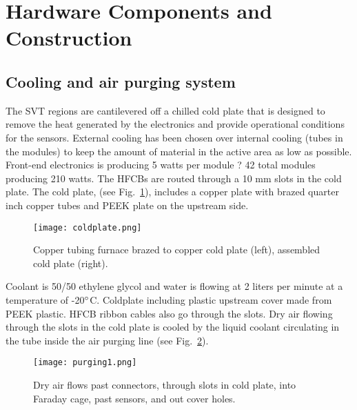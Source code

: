 \section{Hardware Components and Construction}

\subsection{Cooling and air purging system}

The SVT regions are cantilevered off a chilled cold plate that is designed to remove the heat generated by the electronics and provide operational  conditions for the sensors. External cooling has been chosen over internal cooling (tubes in the modules) to keep the amount of material in the active area as low as possible. Front-end electronics is producing 5 watts per module ? 42 total modules producing 210 watts. The HFCBs are routed through a 10 mm slots in the cold plate. The cold plate, (see Fig.~\ref{fig:coldplate}), includes a copper plate with brazed quarter inch copper tubes and PEEK plate on the upstream side. 

\begin{figure}[hbt] 
\centering 
\texttt{[image: coldplate.png]}
\caption{Copper tubing furnace brazed to copper cold plate (left), assembled cold plate (right).}
\label{fig:coldplate}
\end{figure}


Coolant is 50/50 ethylene glycol and water is flowing at 2 liters per minute at a temperature of -20$\degree$C.
Coldplate including plastic upstream cover made from PEEK plastic. HFCB ribbon cables also go through the slots.
Dry air flowing through the slots in the cold plate is cooled by the liquid coolant circulating in the tube inside the air purging line (see Fig.~\ref{fig:purging1}). 

\begin{figure}[hbt] 
\centering 
\texttt{[image: purging1.png]}
\caption{Dry air flows past connectors, through slots in cold plate, into Faraday cage, past sensors, and out cover holes.}
\label{fig:purging1}
\end{figure}

